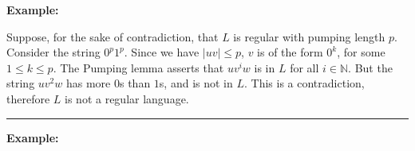 \documentclass[twoside]{article}
\newenvironment{proof}{{\bf Proof:}}{\hfill\rule{2mm}{2mm}}
\begin{document}



\textbf{Example:} 

\begin{proof}
	
	Suppose, for the sake of contradiction, that $L$ is regular with pumping length $p$.  Consider the string $0^p 1^p$. Since we have $|uv| \leq p$, $v$ is of the form $0^k$, for some $1\leq k\leq p$.  The Pumping lemma asserts that $uv^iw$ is in $L$ for all $i\in \mathbb{N}$.  But the string $uv^2w$ has more $0$s than $1$s, and is not in $L$.  This is a contradiction, therefore $L$ is not a regular language.
	
	
\end{proof}






\textbf{Example:} 
\end{document}
